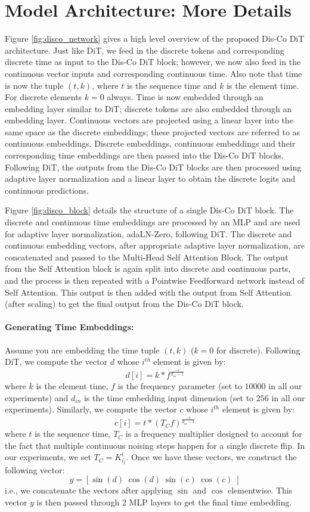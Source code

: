 \section{Model Architecture: More Details}
\label{app:sec:model_arch}

Figure \ref{fig:disco_network} gives a high level overview of the proposed Dis-Co DiT architecture. Just like DiT, we feed in the discrete tokens and corresponding discrete time as input to the Dis-Co DiT block; however, we now also feed in the continuous vector inputs and corresponding continuous time. Also note that time is now the tuple $(t, k)$, where $t$ is the sequence time and $k$ is the element time. For discrete elements $k = 0$ always. Time is now embedded through an embedding layer similar to DiT; discrete tokens are also embedded through an embedding layer. Continuous vectors are projected using a linear layer into the same space as the discrete embeddings; these projected vectors are referred to as continuous embeddings. Discrete embeddings, continuous embeddings and their corresponding time embeddings are then passed into the Dis-Co DiT blocks. Following DiT, the outputs from the Dis-Co DiT blocks are then processed using adaptive layer normalization and a linear layer to obtain the discrete logits and continuous predictions.

Figure \ref{fig:disco_block} details the structure of a single Dis-Co DiT block. The discrete and continuous time embeddings are processed by an MLP and are used for adaptive layer normalization, adaLN-Zero, following DiT. The discrete and continuous embedding vectors, after appropriate adaptive layer normalization, are concatenated and passed to the Multi-Head Self Attention Block. The output from the Self Attention block is again split into discrete and continuous parts, and the process is then repeated with a Pointwise Feedforward network instead of Self Attention. This output is then added with the output from Self Attention (after scaling) to get the final output from the Dis-Co DiT block.


\paragraph{Generating Time Embeddings:}
Assume you are embedding the time tuple $(t, k)$ ($k = 0$ for discrete). Following DiT, we compute the vector $d$ whose $i^{th}$ element is given by:
$$ d[i] = k*f^{\frac{-i}{d_{in}-1}} $$
where $k$ is the element time, $f$ is the frequency parameter (set to $10000$ in all our experiments) and $d_{in}$ is the time embedding input dimension (set to $256$ in all our experiments). Similarly, we compute the vector $c$ whose $i^{th}$ element is given by:
$$ c[i] = t*(T_C f)^{\frac{-i}{d_{in}-1}} $$
where $t$ is the sequence time, $T_C$ is a frequency multiplier designed to account for the fact that multiple continuous noising steps happen for a single discrete flip. In our experiments, we set $T_C = K_{i_t}^t$. Once we have these vectors, we construct the following vector:
$$ y = [\sin(d)\; \cos(d)\; \sin(c)\; \cos(c)\; ] $$
i.e., we concatenate the vectors after applying $\sin$ and $\cos$ elementwise. This vector $y$ is then passed through 2 MLP layers to get the final time embedding.

\newpage
